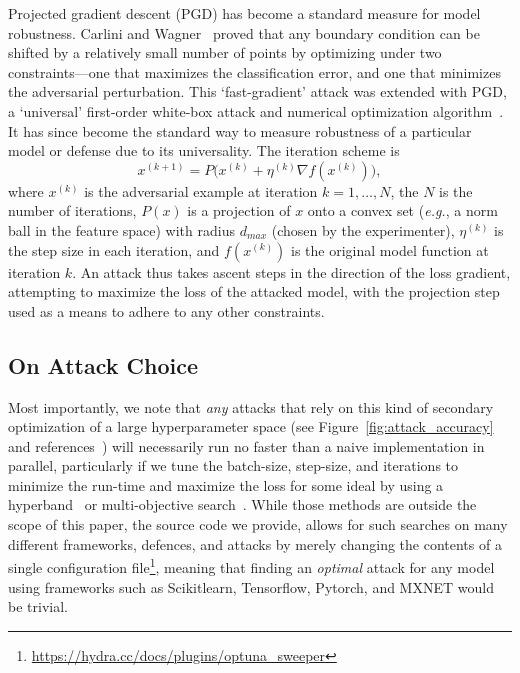 \documentclass[fonts]{icst}
\begin{document}
Projected gradient descent (PGD) has become a standard measure for model robustness.
Carlini and Wagner~\cite{carlini2017towards} proved that any boundary condition can be shifted by a relatively small number of points by optimizing under two constraints---one that maximizes the classification error, and one that minimizes the adversarial perturbation.
This `fast-gradient' attack was extended with PGD, a `universal' first-order white-box attack and numerical optimization algorithm~\cite{madry2017towards}.
It has since become the standard way to measure robustness of a particular model or defense due to its universality.
The iteration scheme is
$$
    x^{(k+1)} = P\big(x^{(k)} + \eta^{(k)} \nabla f(x^{(k)})\big),
$$
where $x^{(k)}$ is the adversarial example at iteration $k = 1,\ldots,N$, the $N$ is the number of iterations, $P(x)$ is a projection of $x$ onto a convex set (\textit{e.g.}, a norm ball in the feature space) with radius $d_{max}$ (chosen by the experimenter), $\eta^{(k)}$ is the step size in each iteration, and $f(x^{(k)})$ is the original model function at iteration $k$.
An attack thus takes ascent steps in the direction of the loss gradient, attempting to maximize the loss of the attacked model, with the projection step used as a means to adhere to any other constraints.

\subsection{On Attack Choice}

Most importantly, we note that \textit{any} attacks that rely on this kind of secondary optimization of a large hyperparameter space (see Figure~\ref{fig:attack_accuracy} and references~\cite{su2019one,carlini2017towards,chen2020hopskipjumpattack,brown2017adversarial,brendel2017decision,croce2020reliable,liu2018dpatch,qin2019imperceptible,grosse2018limitations,kotyan2019adversarial,chen2017zoo}) will necessarily run no faster than a naive implementation in parallel, particularly if we tune the batch-size, step-size, and iterations to minimize the run-time and maximize the loss for some ideal by using a hyperband~\cite{li2017hyperband} or multi-objective search~\cite{hansen2016cma,ozaki2022multiobjective}.
While those methods are outside the scope of this paper, the source code we provide, allows for such searches on many different frameworks, defences, and attacks by merely changing the contents of a single configuration file\footnote{\href{https://hydra.cc/docs/plugins/optuna_sweeper/}{https://hydra.cc/docs/plugins/optuna\_sweeper}}, meaning that finding an \textit{optimal} attack for any model using frameworks such as Scikitlearn, Tensorflow, Pytorch, and MXNET would be trivial.
\end{document}
